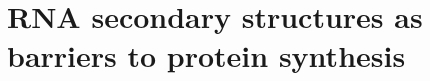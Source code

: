 \documentclass[]{ntnuthesis}
\begin{document}
%

%
%
%


\chapter{RNA secondary structures as barriers to protein synthesis}
\label{chap:celB}


\end{document}
